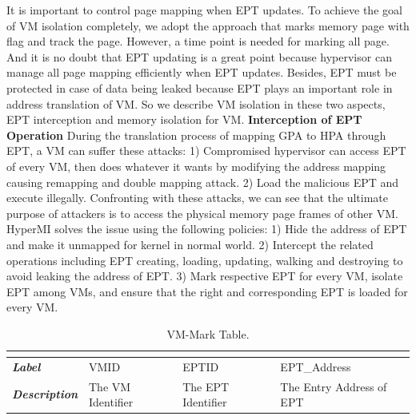 \documentclass[conference]{IEEEtran}
\begin{document}
It is important to control page mapping when EPT updates. To achieve the goal of VM isolation completely, we adopt the approach that marks memory page with flag and track the page. However, a time point is needed for marking all page. And it is no doubt that EPT updating is a great point because hypervisor can manage all page mapping efficiently when EPT updates. Besides, EPT must be protected in case of data being leaked because EPT plays an important role in address translation of VM. So we describe VM isolation in these two aspects, EPT interception and memory isolation for VM.
\textbf{Interception of EPT Operation }
During the translation process of mapping GPA to HPA through EPT, a VM can suffer these attacks: 1) Compromised hypervisor can access EPT of every VM, then does whatever it wants by modifying the address mapping causing remapping and double mapping attack. 2) Load the malicious EPT and execute illegally.
Confronting with these attacks, we can see that the ultimate purpose of attackers is to access the physical memory page frames of other VM. HyperMI solves the issue using the following policies: 1) Hide the address of EPT and make it unmapped for kernel in normal world. 2) Intercept the related operations including EPT creating, loading, updating, walking and destroying to avoid leaking the address of EPT. 3) Mark respective EPT for every VM, isolate EPT among VMs, and ensure that the right and corresponding EPT is loaded for every VM.
\begin{table}[htbp]
\centering
\caption{VM-Mark Table.}\label{tab1}
\begin{tabular}{p{1.4cm}|p{1.2cm}|p{1.1cm}|p{1.7cm}}
\hline
\multicolumn{4}{c}{\bfseries\textbf\centering{VM-Mark Table}}\\
\hline
{\itshape\bfseries Label} & VMID & EPTID & EPT\_Address\\
\hline
{\itshape\bfseries Description} & { The VM Identifier} & The EPT Identifier & The Entry Address of EPT\\
\hline
\end{tabular}
\end{table}
\end{document}
